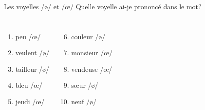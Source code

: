 \documentclass{beamer}
\begin{document}
  \begin{frame}{Les voyelles /ø/ et /œ/}
    Quelle voyelle ai-je prononcé dans le mot?
    \begin{columns}
        \begin{enumerate}
          \item peu  /œ/
          \item veulent /ø/ 
          \item tailleur /ø/ 
          \item bleu  /œ/
          \item jeudi  /œ/
        \end{enumerate}
        \begin{enumerate}
          \setcounter{enumi}{5}
          \item couleur /ø/ 
          \item monsieur  /œ/
          \item vendeuse  /œ/
          \item sœur /ø/ 
          \item neuf /ø/ 
        \end{enumerate}
    \end{columns}
  \end{frame}
\end{document}

